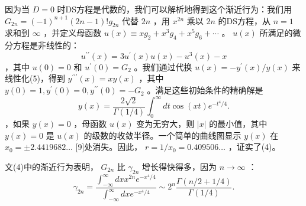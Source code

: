 \documentclass[UTF8]{article}
\begin{document}
因为当 \( D=0 \) 时DS方程是代数的，我们可以解析地得到这个渐近行为：我们用 \( G_{2 n}=(-1)^{n+1}(2 n-1) ! g_{2 n} \) 代替 \( 2 n \) ，用 \( x^{2 n} \) 乘以 \( 2 n \) 的DS方程，从 \( n=1 \) 求和到 \( \infty \) ，并定义母函数 \( u(x) \equiv x g_{2}+x^{3} g_{4}+x^{5} g_{6}+\cdots \) 。 \( u(x) \) 所满足的微分方程是非线性的： \[u^{\prime \prime}(x)=3 u^{\prime}(x) u(x)-u^{3}(x)-x
\] ，其中 \( u(0)=0 \) 和 \( u^{\prime}(0)=G_{2} \) 。我们通过代换 \( u(x)=-y^{\prime}(x) / y(x) \) 来线性化(5)，得到 \( y^{\prime \prime \prime}(x)=x y(x) \) ，其中 \( y(0)=1, y^{\prime}(0)=0, y^{\prime \prime}(0)=-G_{2} \) 。满足这些初始条件的精确解是 \[y(x)=\frac{2 \sqrt{2}}{\Gamma(1 / 4)} \int_{0}^{\infty} d t \cos (x t) e^{-t^{4} / 4} .
\] ，如果 \( y(x)=0 \) ，母函数 \( u(x) \) 变为无穷大，则 \( |x| \) 的最小值，其中 \( y(x)=0 \) 是 \( u(x) \) 的级数的收敛半径。一个简单的曲线图显示 \( y(x) \) 在 \( x_{0}= \pm 2.4419682 \ldots \) [9]处消失。因此， \( r=1 / x_{0}=0.409506 \ldots \) ，证实了(4)。


文(4)中的渐近行为表明， \( G_{2 n} \) 比 \( \gamma_{2 n} \) 增长得快得多，因为 \( n \rightarrow \infty \) ： \[
\gamma_{2 n}=\frac{\int_{-\infty}^{\infty} d x x^{2 n} e^{-x^{4} / 4}}{\int_{-\infty}^{\infty} d x e^{-x^{4} / 4}} \sim 2^{n} \frac{\Gamma(n / 2+1 / 4)}{\Gamma(1 / 4)} .
\] 
\end{document}

